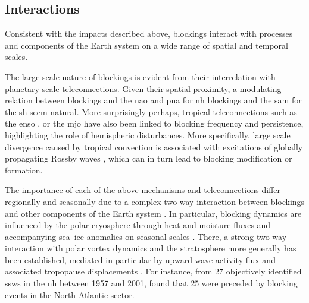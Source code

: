 \subsection{Interactions} \label{sec:intro_block_interactions}
Consistent with the impacts described above, blockings interact with
processes and components of the Earth system on a wide range of spatial and
temporal scales.

The large-scale nature of blockings is evident from their interrelation with
planetary-scale teleconnections. Given their spatial proximity, a modulating
relation between blockings and the \gls{nao}
\parencite{grayElevenyearSolarCycle2016} and \gls{pna}
\parencite{croci-maspoliAtmosphericBlockingSpacetime2007} for \gls{nh}
blockings and the \gls{sam} \parencite{oliveiraNewClimatologySouthern2014} for
the \gls{sh} seem natural. More surprisingly perhaps, tropical teleconnections
such as the \gls{enso} \parencite{zhangENSOrelatedSouthernHemisphere2023,
    mckennaImpactsNinoDiversity2023,barriopedroRelationshipENSOStratospheric2014},
or the \gls{mjo} \parencite{hendersonInfluenceMaddenJulian2016} have also been
linked to blocking frequency and persistence, highlighting the role of
hemispheric disturbances. More specifically, large scale divergence caused by
tropical convection is associated with excitations of globally propagating
Rossby waves \parencite{sardeshmukhGenerationGlobalRotational1988},
which can in turn lead to blocking modification or formation.

The importance of each of the above mechanisms and teleconnections differ
regionally and seasonally due to a complex two-way interaction between
blockings and other components of the Earth system
\parencite{burkhardtPlanetarySynopticscaleInteractions2005,
    nakamuraRoleHighLowFrequency1997}. In particular, blocking dynamics are
influenced by the polar cryosphere through heat and moisture fluxes and
accompanying sea--ice anomalies on seasonal scales
\parencite{tyrlisUralBlockingDriving2019,woollingsArcticWarmingAtmospheric2014,
    drijfhoutSpontaneousAbruptClimate2013}. There, a strong two-way interaction
with polar vortex dynamics and the stratosphere more generally has been
established, mediated in particular by upward wave activity flux and associated
tropopause displacements
\parencite{woollingsAssociationsStratosphericVariability2010,
    colucciDiagnosticComparisonTropospheric2015,
    yessimbetPathwaysInfluenceNorthern2022}. For instance, from 27 objectively
identified \glspl{ssw} in the \gls{nh} between 1957 and 2001,
\textcite{martiusBlockingPrecursorsStratospheric2009} found that 25 were
preceded by blocking events in the North Atlantic sector.

